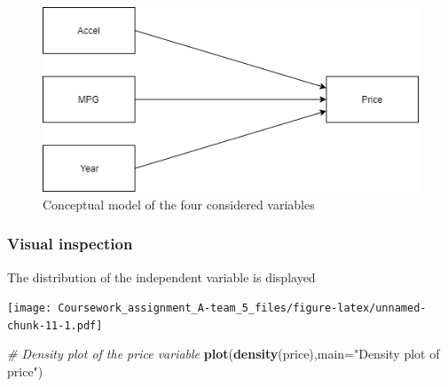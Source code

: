 \documentclass[]{article}
\newenvironment{Shaded}{\begin{snugshade}}{\end{snugshade}}
\newcommand{\KeywordTok}[1]{\textcolor[rgb]{0.13,0.29,0.53}{\textbf{#1}}}
\newcommand{\DataTypeTok}[1]{\textcolor[rgb]{0.13,0.29,0.53}{#1}}
\newcommand{\StringTok}[1]{\textcolor[rgb]{0.31,0.60,0.02}{#1}}
\newcommand{\CommentTok}[1]{\textcolor[rgb]{0.56,0.35,0.01}{\textit{#1}}}
\newcommand{\OperatorTok}[1]{\textcolor[rgb]{0.81,0.36,0.00}{\textbf{#1}}}
\newcommand{\NormalTok}[1]{#1}
\begin{document}
\begin{figure}
\centering
\includegraphics{figures/Conceptual_Model_Q3.png}
\caption{Conceptual model of the four considered variables}
\end{figure}

\subsubsection{Visual inspection}\label{visual-inspection-1}

The distribution of the independent variable is displayed

\begin{Shaded}
\end{Shaded}

\texttt{[image: Coursework\_assignment\_A-team\_5\_files/figure-latex/unnamed-chunk-11-1.pdf]}

\begin{Shaded}
\begin{Highlighting}[]
\CommentTok{# Density plot of the price variable}
\KeywordTok{plot}\NormalTok{(}\KeywordTok{density}\NormalTok{(price),}\DataTypeTok{main=}\StringTok{"Density plot of price"}\NormalTok{)}
\end{Highlighting}
\end{Shaded}
\end{document}
